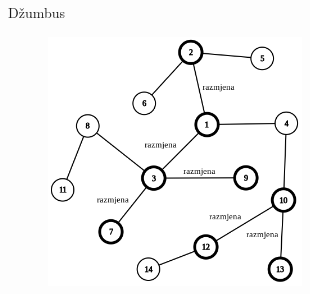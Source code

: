 \begin{statement}[
  problempoints=110,
  timelimit=1 sekunda,
  memorylimit=512 MiB,
]{Džumbus}
\setlength\intextsep{-0.5cm}
\begin{figure}
\centering
\includegraphics[width=0.6\textwidth]{img/tree.png}
\end{figure}

\end{statement}

